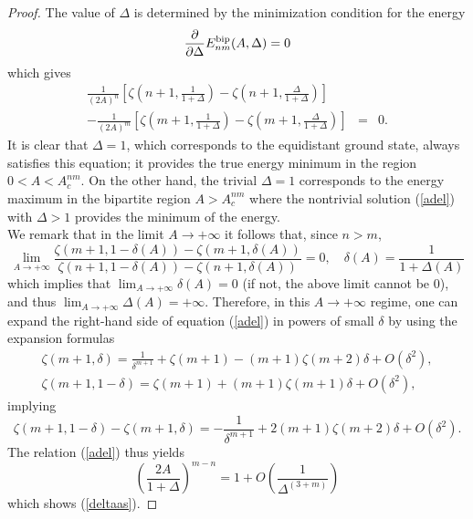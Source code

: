 \documentclass[12pt]{iopart}
\theoremstyle{definition}
\begin{document}
\begin{proof}
The value of $\Delta$ is determined by the minimization condition for
the energy    
\begin{equation}
\frac{\partial}{\partial\Delta} E^{\rm bip}_{nm}(A,\Delta) = 0
\end{equation}
which gives
\begin{eqnarray}
\frac{1}{(2 A)^n} \left[ \zeta\left( n+1,\frac{1}{1+\Delta}\right) -
\zeta\left( n+1,\frac{\Delta}{1+\Delta}\right) \right] & & \nonumber \\
- \frac{1}{(2 A)^m} \left[ \zeta\left( m+1,\frac{1}{1+\Delta}\right) -
\zeta\left( m+1,\frac{\Delta}{1+\Delta}\right) \right] & = & 0 .   
\end{eqnarray}
It is clear that $\Delta=1$, which corresponds to the equidistant ground state,
always satisfies this equation; it provides the true energy minimum in the
region $0<A<A_c^{nm}$.
On the other hand, the trivial $\Delta=1$ corresponds to the energy maximum
in the bipartite region $A>A_c^{nm}$ where the nontrivial solution (\ref{adel})
with $\Delta>1$ provides the minimum of the energy.\\
We remark that in the limit $A\to +\infty$ it follows that, since $n>m$,
$$
\lim_{A\to +\infty} \frac{\zeta(m+1,1-\delta(A))-\zeta(m+1,\delta(A))}{
\zeta(n+1,1-\delta(A))-\zeta(n+1,\delta(A))}=0,\quad \delta(A)
=\frac{1}{1+\Delta(A)}
$$
which implies that $\displaystyle\lim_{A\to +\infty} \delta(A)=0$
(if not, the above limit cannot be $0$), and thus
$\displaystyle\lim_{A\to +\infty} \Delta(A)=+\infty$.
Therefore, in this $A\to +\infty$ regime, one can expand
the right-hand side of equation (\ref{adel}) in powers of small $\delta$
by using the expansion formulas
\begin{eqnarray} 
\zeta(m+1,\delta) = \frac{1}{\delta^{m+1}}+\zeta(m+1)-(m+1)\zeta(m+2)\delta
+ O\left( \delta^2\right) , \nonumber \\
\zeta(m+1,1-\delta) =  \zeta(m+1)+ (m+1) \zeta(m+1)\delta
+ O\left( \delta^2\right) , \label{zetaexp} 
\end{eqnarray}
implying
\begin{equation}
\zeta(m+1,1-\delta) - \zeta(m+1,\delta) = - \frac{1}{\delta^{m+1}}
+ 2 (m+1) \zeta(m+2) \delta + O\left( \delta^2\right) .
\end{equation}
The relation (\ref{adel}) thus yields
\begin{equation}
\left( \frac{2A}{1+\Delta} \right)^{m-n} = 1 +
O\left( \frac{1}{\Delta^{(3+m)}} \right)
\end{equation}  
which shows (\ref{deltaas}).
\end{proof}
\end{document}
